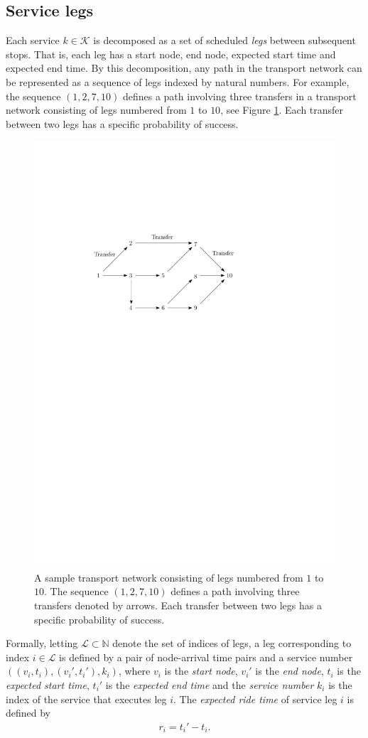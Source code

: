 \documentclass[dissertation,draft*]{aaltoseries}
\begin{document}
\subsection{Service legs}
Each service $k \in \mathcal{K}$ is decomposed as a set of scheduled \emph{legs} between subsequent stops.
That is, each leg has a start node, end node, expected start time and expected end time.
By this decomposition, any path in the transport network can be represented as a sequence 
of legs indexed by natural numbers. For example, 
the sequence $(1,2,7,10)$ defines a path involving three transfers in a transport network consisting of legs
numbered from $1$ to $10$, see Figure \ref{etappiesim}. Each transfer between two legs has a specific probability of success.

\begin{figure}[ht]
\begin{center}
\includegraphics[width=0.5\columnwidth]{etappiesim}
\end{center}
\caption{A sample transport network consisting of legs numbered from $1$ to $10$. 
The sequence $(1,2,7,10)$ defines a path involving three transfers denoted by arrows. 
Each transfer between two legs has a specific probability of success.}
\label{etappiesim}
\end{figure}


Formally, letting $\mathcal{L} \subset \mathbb{N}$ denote the set of indices of legs, 
a leg corresponding to index $i \in \mathcal{L}$ is defined by a pair of 
node-arrival time pairs and a service number $((v_i, t_i), (v_i', t_i'), k_i)$,
where $v_i$ is the \emph{start node}, $v_i'$ is the \emph{end node}, $t_i$ is the \emph{expected start time}, $t_i'$ 
is the \emph{expected end time} and the \emph{service number} $k_i$ is the index of the service that executes leg $i$.
The \emph{expected ride time} of service leg $i$ is defined by 
\begin{align}
\label{exridetime}
 r_i = t_i'-t_i.
\end{align}
\end{document}
